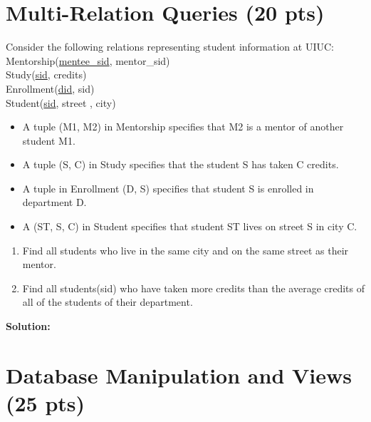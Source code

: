 \documentclass[paper=a4, fontsize=11pt]{scrartcl}
\numberwithin{equation}{section}		%
\numberwithin{figure}{section}			%
\numberwithin{table}{section}				%
\begin{document}
\section{Multi-Relation Queries (20 pts)}
Consider the following relations representing student information at UIUC:\\
Mentorship(\underline{mentee\_sid}, mentor\_sid)\\
Study(\underline{sid}, credits)\\
Enrollment(\underline{did}, sid)\\
Student(\underline{sid}, street , city)

\begin{itemize}
\item A tuple (M1, M2) in Mentorship specifies that M2 is a mentor of another student M1. 
\item A tuple (S, C) in Study specifies that the student S has taken C credits.
\item A tuple in Enrollment (D, S) specifies that student S is enrolled in department D. 
\item A (ST, S, C) in Student specifies that student ST lives on street S in city C.
\end{itemize}

\begin{enumerate}
\item Find all students who live in the same city and on the same street as their mentor.
\item Find all students(sid) who have taken more credits than the average credits of all of the students of their department.
\end{enumerate}


\textbf{Solution: }





\section{Database Manipulation and Views (25 pts)}
\end{document}
